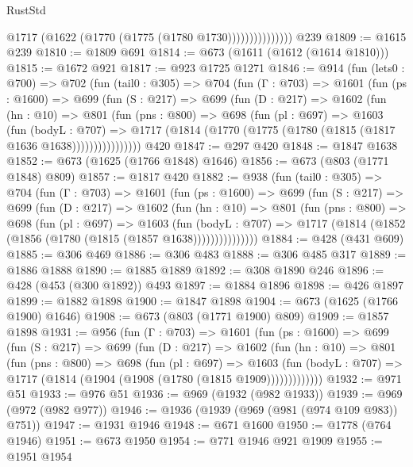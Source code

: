 \begin{lexlean}{RustStd}
\begin{coremodule}
{\begin{coremodule}
{{{{{{{{{{                        @1717 (@1622 (@1770 (@1775 (@1780 @1730)))))))))))))))
    @239
@1809 := @1615 @239
@1810 := @1809 @691
@1814 := @673 (@1611 (@1612 (@1614 @1810)))
@1815 := @1672 @921
@1817 := @923 @1725 @1271
@1846 := @914
    (fun (lets0 : @700) =>
    @702
      (fun (tail0 : @305) =>
      @704
        (fun (Γ : @703) =>
        @1601
          (fun (ps : @1600) =>
          @699
            (fun (S : @217) =>
            @699
              (fun (D : @217) =>
              @1602
                (fun (hn : @10) =>
                @801
                  (fun (pns : @800) =>
                  @698
                    (fun (pl : @697) =>
                    @1603
                      (fun (bodyL : @707) =>
                      @1717 (@1814 (@1770 (@1775 (@1780 (@1815 (@1817 @1636 @1638))))))))))))))))
    @420
@1847 := @297 @420
@1848 := @1847 @1638
@1852 := @673 (@1625 (@1766 @1848) @1646)
@1856 := @673 (@803 (@1771 @1848) @809)
@1857 := @1817 @420
@1882 := @938
    (fun (tail0 : @305) =>
    @704
      (fun (Γ : @703) =>
      @1601
        (fun (ps : @1600) =>
        @699
          (fun (S : @217) =>
          @699
            (fun (D : @217) =>
            @1602
              (fun (hn : @10) =>
              @801
                (fun (pns : @800) =>
                @698
                  (fun (pl : @697) =>
                  @1603
                    (fun (bodyL : @707) =>
                    @1717 (@1814 (@1852 (@1856 (@1780 (@1815 (@1857 @1638)))))))))))))))
@1884 := @428 (@431 @609)
@1885 := @306 @469
@1886 := @306 @483
@1888 := @306 @485 @317
@1889 := @1886 @1888
@1890 := @1885 @1889
@1892 := @308 @1890 @246
@1896 := @428 (@453 (@300 @1892)) @493
@1897 := @1884 @1896
@1898 := @426 @1897
@1899 := @1882 @1898
@1900 := @1847 @1898
@1904 := @673 (@1625 (@1766 @1900) @1646)
@1908 := @673 (@803 (@1771 @1900) @809)
@1909 := @1857 @1898
@1931 := @956
    (fun (Γ : @703) =>
    @1601
      (fun (ps : @1600) =>
      @699
        (fun (S : @217) =>
        @699
          (fun (D : @217) =>
          @1602
            (fun (hn : @10) =>
            @801
              (fun (pns : @800) =>
              @698
                (fun (pl : @697) =>
                @1603
                  (fun (bodyL : @707) => @1717 (@1814 (@1904 (@1908 (@1780 (@1815 @1909)))))))))))))
@1932 := @971 @51
@1933 := @976 @51
@1936 := @969 (@1932 (@982 @1933))
@1939 := @969 (@972 (@982 @977))
@1946 := @1936 (@1939 (@969 (@981 (@974 @109 @983)) @751))
@1947 := @1931 @1946
@1948 := @671 @1600
@1950 := @1778 (@764 @1946)
@1951 := @673 @1950
@1954 := @771 @1946 @921 @1909
@1955 := @1951 @1954
}}}}}}}}}}
\end{coremodule}}
\end{coremodule}
\end{lexlean}
